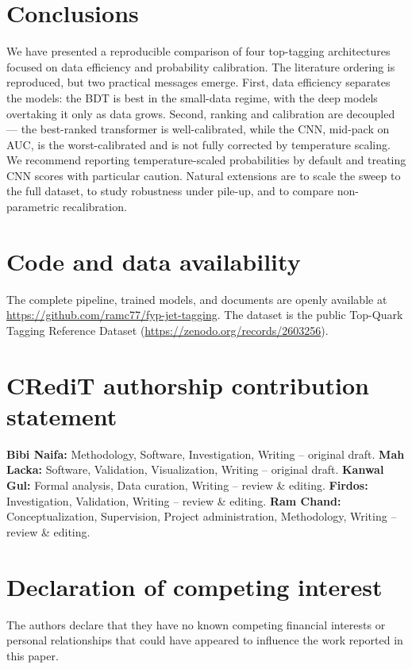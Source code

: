 \documentclass[preprint,12pt]{elsarticle}
\begin{document}
\section{Conclusions}
\label{sec:conclusions}

We have presented a reproducible comparison of four top-tagging
architectures focused on data efficiency and probability calibration. The
literature ordering is reproduced, but two practical messages emerge. First,
data efficiency separates the models: the BDT is best in the small-data
regime, with the deep models overtaking it only as data grows. Second,
ranking and calibration are decoupled --- the best-ranked transformer is
well-calibrated, while the CNN, mid-pack on AUC, is the worst-calibrated and
is not fully corrected by temperature scaling. We recommend reporting
temperature-scaled probabilities by default and treating CNN scores with
particular caution. Natural extensions are to scale the sweep to the full
dataset, to study robustness under pile-up, and to compare non-parametric
recalibration.

\section*{Code and data availability}
The complete pipeline, trained models, and documents are openly available at
\url{https://github.com/ramc77/fyp-jet-tagging}. The dataset is the public
Top-Quark Tagging Reference Dataset \citep{kasieczka2019dataset}
(\url{https://zenodo.org/records/2603256}).

\section*{CRediT authorship contribution statement}
\textbf{Bibi Naifa:} Methodology, Software, Investigation, Writing -- original
draft. \textbf{Mah Lacka:} Software, Validation, Visualization, Writing --
original draft. \textbf{Kanwal Gul:} Formal analysis, Data curation, Writing
-- review \& editing. \textbf{Firdos:} Investigation, Validation, Writing --
review \& editing. \textbf{Ram Chand:} Conceptualization, Supervision, Project
administration, Methodology, Writing -- review \& editing.

\section*{Declaration of competing interest}
The authors declare that they have no known competing financial interests or
personal relationships that could have appeared to influence the work
reported in this paper.
\end{document}
